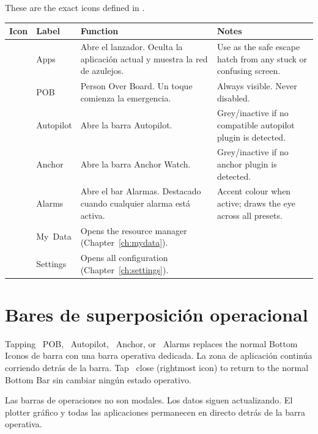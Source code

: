 These are the exact icons defined in .

\begin{longtable}{C{1.4cm}L{2.4cm}L{5.4cm}L{4.5cm}}
\toprule
{}
\color{white}\sffamily\bfseries Icon &
\color{white}\sffamily\bfseries Label &
\color{white}\sffamily\bfseries Function &
\color{white}\sffamily\bfseries Notes \\
\midrule
{}     & Apps      &
Abre el lanzador. Oculta la aplicación actual y muestra la red de azulejos.&
  Use as the safe escape hatch from any stuck or confusing screen. \\
        & POB       &
Person Over Board. Un toque comienza la emergencia.&
  Always visible. Never disabled. \\
& Autopilot &
Abre la barra Autopilot.&
  Grey/inactive if no compatible autopilot plugin is detected. \\
       & Anchor    &
Abre la barra Anchor Watch.&
  Grey/inactive if no anchor plugin is detected. \\
    & Alarms    &
Abre el bar Alarmas. Destacado cuando cualquier alarma está activa.&
  Accent colour when active; draws the eye across all presets. \\
         & My~Data   &
  Opens the resource manager (Chapter~\ref{ch:mydata}). & \\
     & Settings  &
  Opens all configuration (Chapter~\ref{ch:settings}). & \\
\bottomrule
\end{longtable}

\section{Bares de superposición operacional}

Tapping ~POB, ~Autopilot,
~Anchor, or ~Alarms replaces the normal Bottom
Iconos de barra con una barra operativa dedicada.
La zona de aplicación continúa corriendo detrás de la barra.
Tap ~close (rightmost icon) to return to the normal Bottom Bar
sin cambiar ningún estado operativo.

\begin{warningbox}
Las barras de operaciones no son modales.
Los datos siguen actualizando.
El plotter gráfico y todas las aplicaciones permanecen en directo detrás de la barra operativa.
\end{warningbox}

